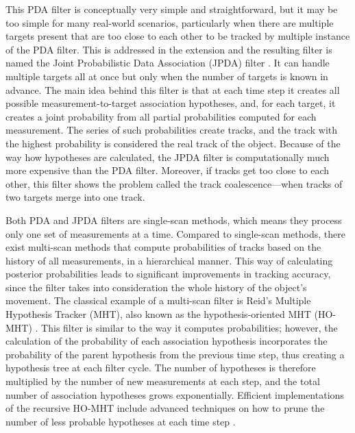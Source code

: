 This PDA filter is conceptually very simple and straightforward, but it may be too simple for many real-world scenarios, particularly when there are multiple targets present that are too close to each other to be tracked by multiple instance of the PDA filter. This is addressed in the extension and the resulting filter is named the Joint Probabilistic Data Association (JPDA) filter \cite{bar-shalomMultitargetmultisensorTrackingPrinciples1995}. It can handle multiple targets all at once but only when the number of targets is known in advance. The main idea behind this filter is that at each time step it creates all possible measurement-to-target association hypotheses, and, for each target, it creates a joint probability from all partial probabilities computed for each measurement. The series of such probabilities create tracks, and the track with the highest probability is considered the real track of the object. Because of the way how hypotheses are calculated, the JPDA filter is computationally much more expensive than the PDA filter. Moreover, if tracks get too close to each other, this filter shows the problem called the track coalescence—when tracks of two targets merge into one track.

Both PDA and JPDA filters are single-scan methods, which means they process only one set of measurements at a time. Compared to single-scan methods, there exist multi-scan methods that compute probabilities of tracks based on the history of all measurements, in a hierarchical manner. This way of calculating posterior probabilities leads to significant improvements in tracking accuracy, since the filter takes into consideration the whole history of the object's movement. The classical example of a multi-scan filter is Reid's Multiple Hypothesis Tracker (MHT), also known as the hypothesis-oriented MHT (HO-MHT) \cite{reidAlgorithmTrackingMultiple1979}. This filter is similar to the way it computes probabilities; however, the calculation of the probability of each association hypothesis incorporates the probability of the parent hypothesis from the previous time step, thus creating a hypothesis tree at each filter cycle. The number of hypotheses is therefore multiplied by the number of new measurements at each step, and the total number of association hypotheses grows exponentially. Efficient implementations of the recursive HO-MHT include advanced techniques on how to prune the number of less probable hypotheses at each time step \cite{coxEfficientImplementationReid1996}.

